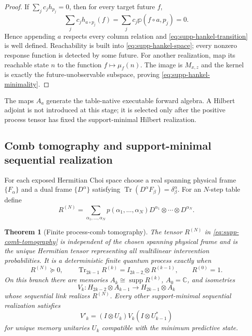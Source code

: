 \documentclass[11pt]{article}
\newtheorem{theorem}{Theorem}[section]
\theoremstyle{definition}
\theoremstyle{remark}
\newcommand{\C}{\mathbb C}
\newcommand{\Tr}{\operatorname{Tr}}
\newcommand{\supp}{\operatorname{supp}}
\begin{document}
\begin{proof}
If $\sum_jc_jh_{p_j}=0$, then for every target future $f$,
\[
 \sum_jc_jh_{a\circ p_j}(f)
 =\sum_jc_j\mathbb p(f\circ a,p_j)=0.
\]
Hence appending $a$ respects every column relation and
\eqref{eq:supp-hankel-transition} is well defined.  Reachability is built into
\eqref{eq:supp-hankel-space}; every nonzero response function is detected by
some future.  For another realization, map its reachable state $n$ to the
function $f\mapsto\mu_f(n)$.  The image is $M_{x,z}$ and the kernel is exactly
the future-unobservable subspace, proving
\eqref{eq:supp-hankel-minimality}.
\end{proof}

The maps $A_a$ generate the table-native executable forward algebra.  A
Hilbert adjoint is not introduced at this stage; it is selected only after the
positive process tensor has fixed the support-minimal Hilbert realization.

\subsection{Comb tomography and support-minimal sequential realization}

For each exposed Hermitian Choi space choose a real spanning physical frame
$\{F_\alpha\}$ and a dual frame $\{D^\alpha\}$ satisfying
$\Tr(D^\alpha F_\beta)=\delta^\alpha_\beta$.  For an $N$-step table define
\begin{equation}
 R^{(N)}
 =\sum_{\alpha_1,\ldots,\alpha_N}
 p(\alpha_1,\ldots,\alpha_N)
 D^{\alpha_1}\otimes\cdots\otimes D^{\alpha_N}.
 \label{eq:supp-comb-tomography}
\end{equation}

\begin{theorem}[Finite process-comb tomography]
\label{thm:supp-comb-tomography}
The tensor $R^{(N)}$ in \eqref{eq:supp-comb-tomography} is independent of the
chosen spanning physical frame and is the unique Hermitian tensor representing
all multilinear intervention probabilities.  It is a deterministic finite
quantum process exactly when
\begin{equation}
 R^{(N)}\succeq0,
 \qquad
 \Tr_{2k-1}R^{(k)}=I_{2k-2}\otimes R^{(k-1)},
 \qquad
 R^{(0)}=1.
 \label{eq:supp-comb-conditions}
\end{equation}
On this branch there are memories
$A_k\cong\overline{\supp R^{(k)}}$, $A_0=\C$, and isometries
\begin{equation}
 V_k:H_{2k-2}\otimes A_{k-1}
 \longrightarrow H_{2k-1}\otimes A_k
 \label{eq:supp-comb-isometry}
\end{equation}
whose sequential link realizes $R^{(N)}$.  Every other support-minimal
sequential realization satisfies
\begin{equation}
 V'_k=(I\otimes U_k)V_k(I\otimes U_{k-1}^*)
 \label{eq:supp-comb-unitary}
\end{equation}
for unique memory unitaries $U_k$ compatible with the minimum predictive state.
\end{theorem}
\end{document}
